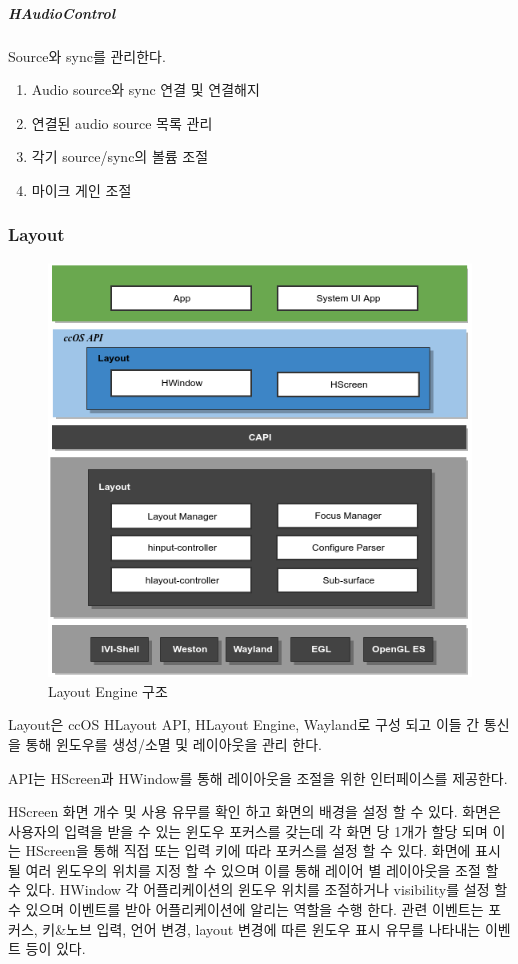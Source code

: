 	\subparagraph{HAudioControl}
	Source와 sync를 관리한다.
	\begin{enumerate}
		\item Audio source와 sync 연결 및 연결해지
		\item 연결된 audio source 목록 관리
		\item 각기 source/sync의 볼륨 조절
		\item 마이크 게인 조절
\end{enumerate}

\subsubsection{Layout}
\begin{figure}[h]
\centering
\includegraphics[width=1\textwidth]{fig/layout_engine.png}
\caption{Layout Engine 구조}
\end{figure}
Layout은 ccOS HLayout API, HLayout Engine, Wayland로 구성 되고 이들 간 통신을 통해 윈도우를 생성/소멸 및 레이아웃을 관리 한다.

 API는 HScreen과 HWindow를 통해 레이아웃을 조절을 위한 인터페이스를 제공한다.

    HScreen
        화면 개수 및 사용 유무를 확인 하고 화면의 배경을 설정 할 수 있다. 화면은 사용자의 입력을 받을 수 있는 윈도우 포커스를 갖는데 각 화면 당 1개가 할당 되며 이는 HScreen을 통해 직접 또는 입력 키에 따라 포커스를 설정 할 수 있다.
        화면에 표시 될 여러 윈도우의 위치를 지정 할 수 있으며 이를 통해 레이어 별 레이아웃을 조절 할 수 있다.
    HWindow
        각 어플리케이션의 윈도우 위치를 조절하거나 visibility를 설정 할 수 있으며 이벤트를 받아 어플리케이션에 알리는 역할을 수행 한다. 관련 이벤트는 포커스, 키\&노브 입력, 언어 변경, layout 변경에 따른 윈도우 표시 유무를 나타내는 이벤트 등이 있다.

